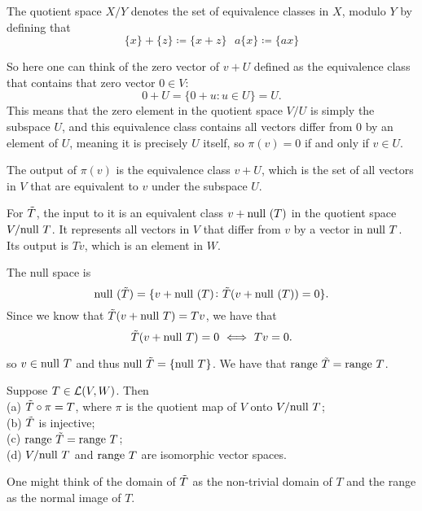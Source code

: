 \documentclass{extarticle}
\begin{document}
The quotient space \(X / Y\) denotes the set of equivalence classes in \(X\), modulo \(Y\) by defining that 
\[\{x\} + \{z\} \coloneqq \{x+ z\} \ \ \ a\{x\} \coloneqq \{ax\}\]

So here one can think of the zero vector of \(v + U\) defined as the equivalence class that contains that 
zero vector \(0 \in V\): 
\[0 + U = \{0 + u \colon u \in U\} = U.\]
This means that the zero element in the quotient space \(V / U\) is simply the subspace \(U\), and this 
equivalence class contains all vectors differ from 0 by an element of \(U\), meaning it is precisely 
\(U\) itself, so \(\pi(v) = 0\) if and only if \(v \in U\). 

\begin{remark}
    The output of \(\pi(v)\) is the equivalence class \(v + U\), which is the set of all vectors in \(V\)
    that are equivalent to \(v\) under the subspace \(U\).
\end{remark}

For \(\Tilde{T}\), the input to it is an equivalent class \(v + \text{null } (T)\) in the quotient space \(V / \text{null } T\). 
It represents all vectors in \(V\) that differ from \(v\) by a vector in \(\text{null } T\). Its output is 
\(T v\), which is an element in \(W\). 

The null space is 
\[\text{null } (\tilde{T}) = \{v + \text{null }(T) \colon \tilde{T}(v + \text{null } (T)) = 0\}. \]
Since we know that \(\tilde{T}(v + \text{null } T) = Tv\), we have that 
\[\Tt(v + \nul T) = 0 \ \Longleftrightarrow \ Tv = 0.\]

so \(v \in \text{null } T\) and thus \(\text{null } \tilde{T} = \{\text{null } T\}\). We have that \(\text{range } \tilde{T} = \text{range } T\).

\begin{thm}
    Suppose \(T \in \mathcal{L}(V, W)\). Then \\ 
    (a) \(\tilde{T} \circ \pi = T\), where \(\pi\) is the quotient map of \(V\) onto \(V / \text{null } T\); \\ 
    (b) \(\tilde{T}\) is injective;\\ 
    (c) \(\text{range } \tilde{T} = \text{range } T\);\\ 
    (d) \(V / \text{null } T\) and \(\text{range } T\) are isomorphic vector spaces. 
\end{thm}

\begin{remark}
    One might think of the domain of \(\tilde{T}\) as the non-trivial domain of \(T\) and the range as the normal 
    image of \(T\). 
\end{remark}

\newpage 
{}
\end{document}
